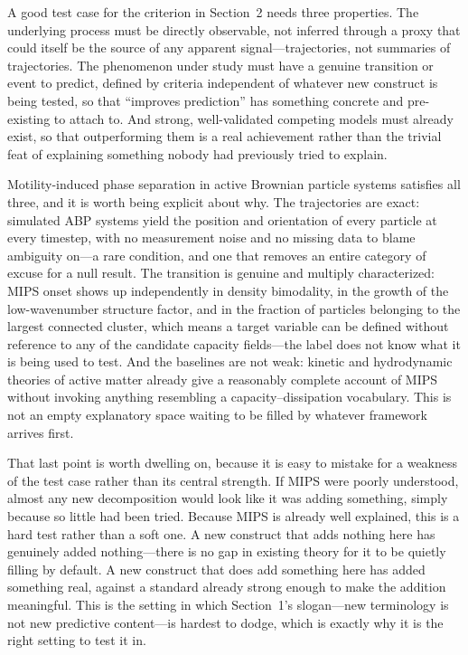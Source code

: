 \documentclass[11pt]{article}
\begin{document}
A good test case for the criterion in Section~2 needs three properties. The underlying process must be directly observable, not inferred through a proxy that could itself be the source of any apparent signal---trajectories, not summaries of trajectories. The phenomenon under study must have a genuine transition or event to predict, defined by criteria independent of whatever new construct is being tested, so that ``improves prediction'' has something concrete and pre-existing to attach to. And strong, well-validated competing models must already exist, so that outperforming them is a real achievement rather than the trivial feat of explaining something nobody had previously tried to explain.

Motility-induced phase separation in active Brownian particle systems satisfies all three, and it is worth being explicit about why. The trajectories are exact: simulated ABP systems yield the position and orientation of every particle at every timestep, with no measurement noise and no missing data to blame ambiguity on---a rare condition, and one that removes an entire category of excuse for a null result. The transition is genuine and multiply characterized: MIPS onset shows up independently in density bimodality, in the growth of the low-wavenumber structure factor, and in the fraction of particles belonging to the largest connected cluster, which means a target variable can be defined without reference to any of the candidate capacity fields---the label does not know what it is being used to test. And the baselines are not weak: kinetic and hydrodynamic theories of active matter already give a reasonably complete account of MIPS without invoking anything resembling a capacity--dissipation vocabulary. This is not an empty explanatory space waiting to be filled by whatever framework arrives first.

That last point is worth dwelling on, because it is easy to mistake for a weakness of the test case rather than its central strength. If MIPS were poorly understood, almost any new decomposition would look like it was adding something, simply because so little had been tried. Because MIPS is already well explained, this is a hard test rather than a soft one. A new construct that adds nothing here has genuinely added nothing---there is no gap in existing theory for it to be quietly filling by default. A new construct that does add something here has added something real, against a standard already strong enough to make the addition meaningful. This is the setting in which Section~1's slogan---new terminology is not new predictive content---is hardest to dodge, which is exactly why it is the right setting to test it in.
\end{document}

